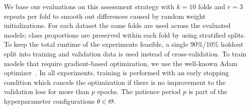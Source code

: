 We base our evaluations on this assessment strategy with $k = 10$ folds and $r = 3$ repeats per fold to smooth out differences caused by random weight initializations.
For each dataset the same folds are used across the evaluated models; class proportions are preserved within each fold by using stratified splits.
To keep the total runtime of the experiments feasible, a single 90\%/10\% holdout split into training and validation data is used instead of cross-validation.
To train models that require gradient-based optimization, we use the well-known Adam optimizer~\cite{Kingma2015}.
In all experiments, training is performed with an early stopping condition which cancels the optimization if there is no improvement to the validation loss for more than $p$ epochs.
The patience period $p$ is part of the hyperparameter configurations $\theta \in \Theta$.

